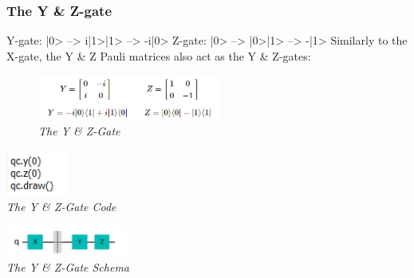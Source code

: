 \documentclass{article}
\begin{document}
\subsubsection{The Y \& Z-gate }
Y-gate: |0> --> i|1>\tab|1> --> -i|0>
\newline
Z-gate: |0> --> |0>\tab|1> --> -|1>
\newline
Similarly to the X-gate, the Y \& Z Pauli matrices also act as the Y \& Z-gates:
\begin{figure}[h]
\begin{center}
\begin{minipage}[b]{4cm}
\centering
\includegraphics[width=6cm]{yandz_gate.png}\\\textit{The Y \& Z-Gate}
\end{minipage}
\end{center}
\end{figure}
\begin{mdframed}
\begin{center}
\begin{minipage}[b]{4cm}
\centering
\includegraphics[width=2cm]{yandz_code.png}\\\textit{The Y \& Z-Gate Code}
\end{minipage}
\begin{minipage}[b]{4cm}
\centering
\includegraphics[width=4cm]{yandz_gate_schema.png}\\\textit{The Y \& Z-Gate Schema}
\end{minipage}
\end{center}
\end{mdframed}
\end{document}
